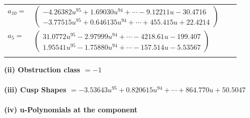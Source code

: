 \documentclass[1p]{elsarticle_modified}
\theoremstyle{definition}
\begin{document}
\begin{tabular}{m{7pt} m{180pt} m{7pt} m{180pt} }
\flushright $a_{10}=$&$\begin{pmatrix}-4.26382 u^{95}+1.69030 u^{94}+\cdots-9.12211 u-30.4716\\-3.77515 u^{95}+0.646135 u^{94}+\cdots+455.415 u+22.4214\end{pmatrix}$ \\
\flushright $a_{5}=$&$\begin{pmatrix}31.0772 u^{95}-2.97999 u^{94}+\cdots-4218.61 u-199.407\\1.95541 u^{95}-1.75880 u^{94}+\cdots-157.514 u-5.53567\end{pmatrix}$\\&\end{tabular}
\flushleft \textbf{(ii) Obstruction class $= -1$}\\~\\
\flushleft \textbf{(iii) Cusp Shapes $= -3.53643 u^{95}+0.820615 u^{94}+\cdots+864.770 u+50.5047$}\\~\\
\newpage\renewcommand{\arraystretch}{1}
\flushleft \textbf{(iv) u-Polynomials at the component}\newline \\
\end{document}

